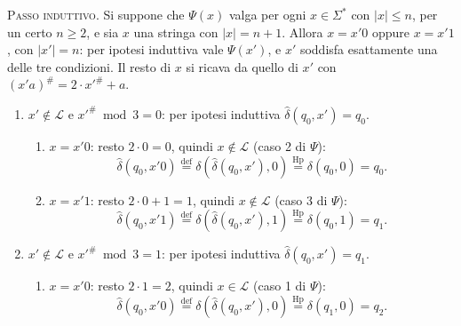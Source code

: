 \documentclass[a4paper, 11pt, oneside]{book}
\theoremstyle{formale}
\begin{document}
    \textsc{Passo induttivo}. Si suppone che $\Psi(x)$ valga per ogni $x \in \Sigma^*$ con
    $|x| \leq n$, per un certo $n \geq 2$, e sia $x$ una stringa con $|x| = n + 1$. Allora
    $x = x'0$ oppure $x = x'1$, con $|x'| = n$: per ipotesi induttiva vale $\Psi(x')$, e
    $x'$ soddisfa esattamente una delle tre condizioni. Il resto di $x$ si ricava da
    quello di $x'$ con $(x'a)^\# = 2 \cdot x'^\# + a$.
    \begin{enumerate}
        \item $x' \notin \mathcal{L}$ e $x'^\# \bmod 3 = 0$: per ipotesi induttiva
            $\hat{\delta}(q_0, x') = q_0$.
            \begin{enumerate}[label=\arabic{enumi}\alph*.]
                \item $x = x'0$: resto $2 \cdot 0 = 0$, quindi $x \notin \mathcal{L}$ (caso 2
                    di $\Psi$):
                    \begin{equation*}
                        \hat{\delta}(q_0, x'0)
                        \overset{\text{def}}{=} \delta(\hat{\delta}(q_0, x'), 0)
                        \overset{\text{Hp}}{=} \delta(q_0, 0) = q_0.
                    \end{equation*}
                \item $x = x'1$: resto $2 \cdot 0 + 1 = 1$, quindi $x \notin \mathcal{L}$ (caso 3
                    di $\Psi$):
                    \begin{equation*}
                        \hat{\delta}(q_0, x'1)
                        \overset{\text{def}}{=} \delta(\hat{\delta}(q_0, x'), 1)
                        \overset{\text{Hp}}{=} \delta(q_0, 1) = q_1.
                    \end{equation*}
            \end{enumerate}
        \item $x' \notin \mathcal{L}$ e $x'^\# \bmod 3 = 1$: per ipotesi induttiva
            $\hat{\delta}(q_0, x') = q_1$.
            \begin{enumerate}[label=\arabic{enumi}\alph*.]
                \item $x = x'0$: resto $2 \cdot 1 = 2$, quindi $x \in \mathcal{L}$ (caso 1
                    di $\Psi$):
                    \begin{equation*}
                        \hat{\delta}(q_0, x'0)
                        \overset{\text{def}}{=} \delta(\hat{\delta}(q_0, x'), 0)
                        \overset{\text{Hp}}{=} \delta(q_1, 0) = q_2.
                    \end{equation*}

\end{enumerate}
\end{enumerate}
\end{document}
